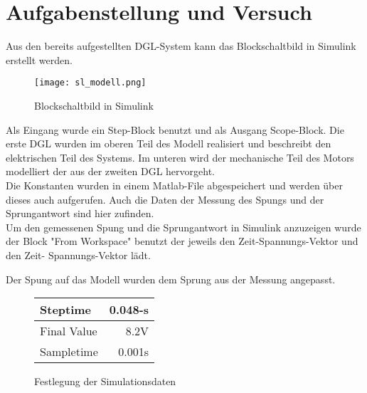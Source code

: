 \section{Aufgabenstellung und Versuch}

Aus den bereits aufgestellten DGL-System kann das Blockschaltbild in Simulink
erstellt werden.

\begin{figure}[H]
    \centering
    \texttt{[image: sl\_modell.png]}
    \caption{Blockschaltbild in Simulink}
    \label{fig:Blockschaltbild}
\end{figure}

Als Eingang wurde ein Step-Block benutzt und als Ausgang Scope-Block.
Die erste DGL wurden im oberen Teil des Modell realisiert und beschreibt
den elektrischen Teil des Systems. Im unteren wird der mechanische Teil
des Motors modelliert der aus der zweiten DGL hervorgeht.\\

Die Konstanten wurden in einem Matlab-File abgespeichert und werden über
dieses auch aufgerufen. Auch die Daten der Messung des Spungs und der
Sprungantwort sind hier zufinden.\\

Um den gemessenen Spung und die Sprungantwort in Simulink anzuzeigen wurde der Block
"From Workspace" benutzt der jeweils den Zeit-Spannungs-Vektor und den Zeit-
Spannungs-Vektor lädt.

Der Spung auf das Modell wurden dem Sprung aus der Messung angepasst.\\

\begin{figure}[H]
    \centering    
    \begin{tabular}[h]{l| r}
        Steptime & 0.048-s \\
        \hline
        Final Value & 8.2V \\
        \hline
        Sampletime & 0.001s \\
    \end{tabular}
    \caption{Festlegung der Simulationsdaten}
\end{figure}
    